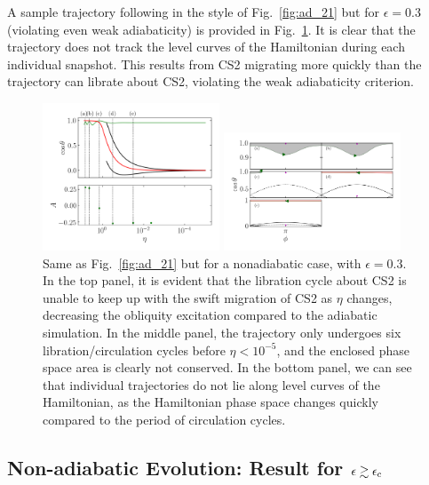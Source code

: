 \documentclass[twocolumn,twocolappendix]{aastex63}
\begin{document}
A sample trajectory following in the style of Fig.~\ref{fig:ad_21} but for
$\epsilon = 0.3$ (violating even weak adiabaticity) is provided in
Fig.~\ref{fig:nonad_traj}. It is clear that the trajectory does not track the
level curves of the Hamiltonian during each individual snapshot. This results
from CS2 migrating more quickly than the trajectory can librate about CS2,
violating the weak adiabaticity criterion.
\begin{figure}
    \centering
    \includegraphics[width=0.47\textwidth]{plots_diskdisp/3testo_nonad.png}

    \includegraphics[width=0.47\textwidth]{plots_diskdisp/3testo_nonad_subplots.png}
    \caption{Same as Fig.~\ref{fig:ad_21} but for a nonadiabatic case, with $\epsilon =
    0.3$. In the top panel, it is evident that the libration cycle about CS2 is
    unable to keep up with the swift migration of CS2 as $\eta$ changes,
    decreasing the obliquity excitation compared to the adiabatic simulation. In
    the middle panel, the trajectory only undergoes six libration/circulation
    cycles before $\eta < 10^{-5}$, and the enclosed phase space area is
    clearly not conserved. In the bottom panel, we can see that individual
    trajectories do not lie along level curves of the Hamiltonian, as the
    Hamiltonian phase space changes quickly compared to the period of
    circulation cycles.}\label{fig:nonad_traj}
\end{figure}

\subsection{Non-adiabatic Evolution:
Result for $\epsilon\gtrsim \epsilon_{\rm c}$}
\end{document}
